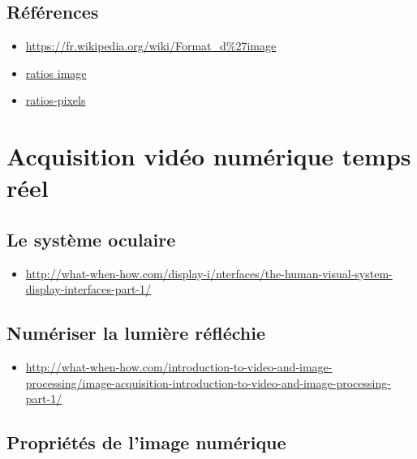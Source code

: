 \documentclass[
  french,
]{book}
\providecommand{\tightlist}{%
  \setlength{\itemsep}{0pt}\setlength{\parskip}{0pt}}
\begin{document}
\hypertarget{ruxe9fuxe9rences}{%
\subsection{Références}\label{ruxe9fuxe9rences}}

\begin{itemize}
\tightlist
\item
  \url{https://fr.wikipedia.org/wiki/Format_d\%27image}
\item
  \href{https://en.wikipedia.org/wiki/Display_aspect_ratio}{ratios image}
\item
  \href{https://en.wikipedia.org/wiki/Pixel_aspect_ratio}{ratios-pixels}
\end{itemize}

\hypertarget{acquerir_captation}{%
\section{Acquisition vidéo numérique temps réel}\label{acquerir_captation}}

\hypertarget{le-systuxe8me-oculaire}{%
\subsection{Le système oculaire}\label{le-systuxe8me-oculaire}}

\begin{itemize}
\tightlist
\item
  \url{http://what-when-how.com/display-i/nterfaces/the-human-visual-system-display-interfaces-part-1/}
\end{itemize}

\hypertarget{numuxe9riser-la-lumiuxe8re-ruxe9fluxe9chie}{%
\subsection{Numériser la lumière réfléchie}\label{numuxe9riser-la-lumiuxe8re-ruxe9fluxe9chie}}

\begin{itemize}
\tightlist
\item
  \url{http://what-when-how.com/introduction-to-video-and-image-processing/image-acquisition-introduction-to-video-and-image-processing-part-1/}
\end{itemize}

\hypertarget{propriuxe9tuxe9s-de-limage-numuxe9rique}{%
\subsection{Propriétés de l'image numérique}\label{propriuxe9tuxe9s-de-limage-numuxe9rique}}
\end{document}
